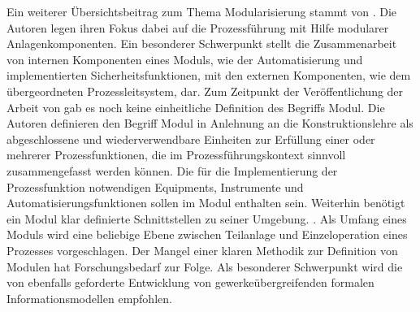 Ein weiterer \"Ubersichtsbeitrag zum Thema Modularisierung stammt von \citeauthor{Urbas_2012} . Die Autoren legen ihren Fokus dabei auf die Prozessf\"uhrung mit Hilfe modularer Anlagenkomponenten. Ein besonderer Schwerpunkt stellt die Zusammenarbeit von internen Komponenten eines Moduls, wie der Automatisierung und implementierten Sicherheitsfunktionen, mit den externen Komponenten, wie dem \"ubergeordneten Prozessleitsystem, dar. \newline
Zum Zeitpunkt der Ver\"offentlichung der Arbeit  von \citeauthor{Urbas_2012} gab es noch keine einheitliche Definition des Begriffs \glqq Modul\grqq { }. Die Autoren definieren den Begriff Modul in Anlehnung an die Konstruktionslehre als \glqq abgeschlossene und wiederverwendbare Einheiten zur Erf\"ullung einer oder mehrerer Prozessfunktionen, die im Prozessf\"uhrungskontext sinnvoll zusammengefasst werden k\"onnen.\grqq { }\cite[S. 2]{Urbas_2012} Die für die Implementierung der Prozessfunktion notwendigen Equipments, Instrumente und Automatisierungsfunktionen sollen im Modul enthalten sein. Weiterhin ben\"otigt ein Modul klar definierte Schnittstellen zu seiner Umgebung. \cite[S. 2]{Urbas_2012}. Als Umfang eines Moduls wird eine beliebige Ebene zwischen Teilanlage und Einzeloperation eines Prozesses vorgeschlagen. Der Mangel einer klaren Methodik zur Definition von Modulen hat Forschungsbedarf zur Folge. Als besonderer Schwerpunkt wird die von \citeauthor{Bramsiepe_2012} ebenfalls geforderte Entwicklung von gewerke\"ubergreifenden formalen Informationsmodellen empfohlen. \cite{Urbas_2012} \newline


